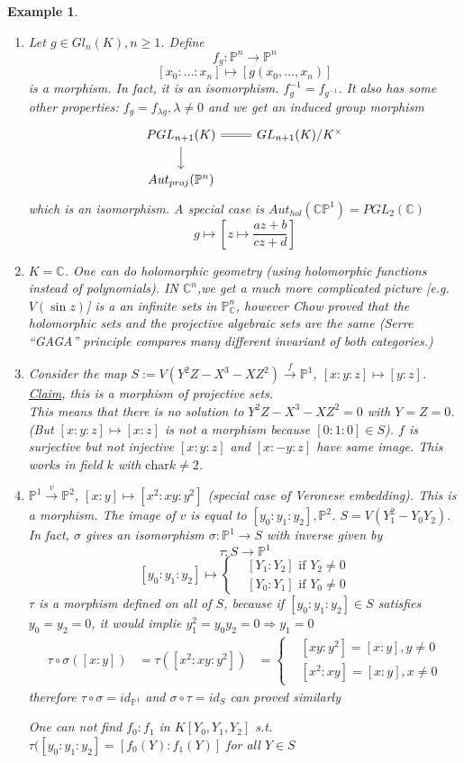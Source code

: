 \documentclass[11pt]{article}
\newtheorem{ex}[thm]{Example}
\newcommand{\proj}{\mathbb P}
\newcommand{\cplx}{\mathbb C}
\newcommand{\Lrta}{\Longrightarrow}
\newcommand{\lrta}{\longrightarrow}
\begin{document}
\begin{ex}
\begin{enumerate}[label=(\arabic*)]
\item Let $g\in Gl_n(K), n\geq 1$. Define 
$$
f_g:\proj^n\lrta \proj^n
$$
$$
[x_0:...:x_n]\longmapsto [g(x_0,...,x_n)]
$$
is a morphism. In fact, it is an isomorphism. $f^{-1}_g=f_{g^{-1}}$.
It also has some other properties: $f_{g}=f_{\lambda g},\lambda\neq 0$ and we get an induced group morphism
\[
\begin{tikzcd}
PGL_{n+1}(K) \arrow[d] \arrow[r, equal] & GL_{n+1}(K)/K^\times \\
Aut_{proj}(\proj^n) & 
\end{tikzcd}
\]
which is an isomorphism. A special case is $Aut_{hol}(\cplx \proj^1)=PGL_2(\cplx)$
$$
g\longmapsto \left[z\mapsto \frac{az+b}{cz+d}\right]
$$
\item  $K=\cplx$. One can do  holomorphic geometry (using holomorphic functions instead of polynomials). IN $\cplx^n$,we get a  much more complicated picture [e.g. $V(\sin z)$] is a an infinite sets in $\proj^n_\cplx$, however Chow proved that the holomorphic sets and the projective algebraic sets are the same (Serre ``GAGA'' principle compares many different invariant of both categories.)
\item Consider the map $S:=V(Y^2Z-X^3-XZ^2)\overset{f}{\lrta} \proj^1$, $[x:y:z]\mapsto [y:z]$. \\
\underline{Claim}, this is a morphism of projective sets.
\\
This means that there is no solution to $Y^2Z-X^3-XZ^2=0$ with $Y=Z=0$. (But $[x:y:z]\mapsto [x:z]$ is not a morphism because $[0:1:0]\in S$). $f$ is surjective but not injective $[x:y:z]$ and $[x:-y:z]$ have same image. This works in field $k$ with $\text{char} k\neq 2$.
\item $\proj^1\overset{v}{\lrta} \proj^2$, $[x:y]\mapsto [x^2:xy:y^2]$ (special case of Veronese embedding). This is a morphism. The image of $v$ is equal to $[y_0:y_1:y_2], \proj^2$. $S=V(Y_1^2-Y_0Y_2)$.  In fact, $\sigma$ gives an isomorphism
$\sigma: \proj^1\lrta S$ with inverse given by 
$$
\tau: S\lrta \proj^1
$$
$$
[y_0:y_1:y_2]\mapsto\left\{\begin{matrix*}
&[Y_1:Y_2] \text{ if } Y_2\neq 0\\
&[Y_0:Y_1]\text{ if } Y_0\neq 0
\end{matrix*}
\right.
$$
$\tau$ is a morphism defined on all of $S$, because if $[y_0:y_1:y_2]\in S$ satisfies $y_0=y_2=0$, it would implie $y^2_1=y_0y_2=0\Lrta y_1=0$ 
$$
\begin{aligned}
\tau\circ \sigma([x:y])&=\tau([x^2:xy:y^2])
&=\left\{\begin{matrix*}
&[xy:y^2]=[x:y], y\neq 0
\\
&[x^2:xy]=[x:y], x\neq 0
\end{matrix*}\right.
\end{aligned}
$$
therefore $\tau\circ \sigma= id_{\proj^1}$ and $\sigma\circ \tau=id_S$ can proved similarly

One can not find $f_0:f_1$ in $K[Y_0,Y_1,Y_2]$ s.t. $\tau([y_0:y_1:y_2]=[f_0(Y):f_1(Y)]$ for all $Y\in S$
\end{enumerate}
\end{ex}
\end{document}
